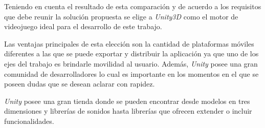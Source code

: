 Teniendo en cuenta el resultado de esta comparación y de acuerdo a los
requisitos que debe reunir la solución propuesta se elige a \textit{Unity3D}
como el motor de videojuego ideal para el desarrollo de este trabajo.

Las ventajas principales de esta elección son la cantidad de plataformas móviles
diferentes a las que se puede exportar y distribuir la aplicación ya que uno de
los ejes del trabajo es brindarle movilidad al usuario. Además, \textit{Unity}
posee una gran comunidad de desarrolladores lo cual es importante en los
momentos en el que se poseen dudas que se desean aclarar con rapidez.

\textit{Unity} posee una gran tienda donde se pueden encontrar desde modelos en
tres dimensiones y librerías de sonidos hasta librerías que ofrecen extender o
incluir funcionalidades. 



